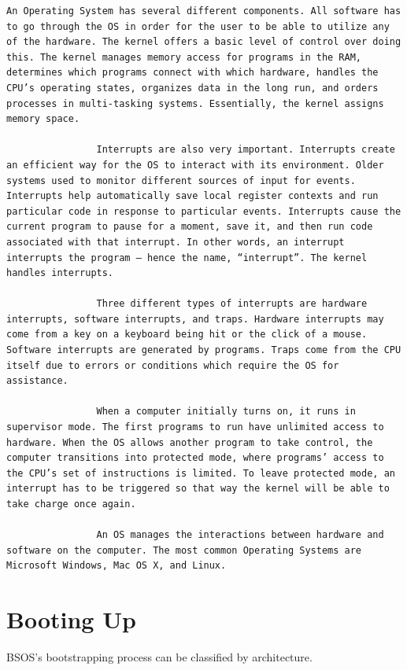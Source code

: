 \documentclass[english]{article}
\begin{document}
\begin{lstlisting}
An Operating System has several different components. All software has to go through the OS in order for the user to be able to utilize any of the hardware. The kernel offers a basic level of control over doing this. The kernel manages memory access for programs in the RAM, determines which programs connect with which hardware, handles the CPU’s operating states, organizes data in the long run, and orders processes in multi-tasking systems. Essentially, the kernel assigns memory space.

                Interrupts are also very important. Interrupts create an efficient way for the OS to interact with its environment. Older systems used to monitor different sources of input for events. Interrupts help automatically save local register contexts and run particular code in response to particular events. Interrupts cause the current program to pause for a moment, save it, and then run code associated with that interrupt. In other words, an interrupt interrupts the program – hence the name, “interrupt”. The kernel handles interrupts.

                Three different types of interrupts are hardware interrupts, software interrupts, and traps. Hardware interrupts may come from a key on a keyboard being hit or the click of a mouse. Software interrupts are generated by programs. Traps come from the CPU itself due to errors or conditions which require the OS for assistance.

                When a computer initially turns on, it runs in supervisor mode. The first programs to run have unlimited access to hardware. When the OS allows another program to take control, the computer transitions into protected mode, where programs’ access to the CPU’s set of instructions is limited. To leave protected mode, an interrupt has to be triggered so that way the kernel will be able to take charge once again.

                An OS manages the interactions between hardware and software on the computer. The most common Operating Systems are Microsoft Windows, Mac OS X, and Linux.
\end{lstlisting}


\part{Booting Up}
BSOS's bootstrapping process can be classified by architecture. 
\end{document}
